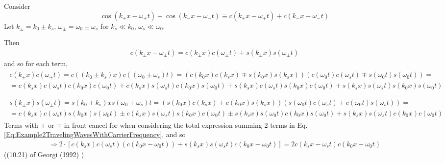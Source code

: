 \documentclass[10pt]{amsart}
\begin{document}
\begin{multicols*}{2}
Consider 
\[
\cos{ (k_+ x - \omega_+ t)} + \cos{ (k_- x - \omega_- t)} \equiv c(k_+ x - \omega_+ t) + c(k_- x - \omega_- t)
\]
Let $k_{\pm} = k_0 \pm k_s$, $\omega_{\pm} = \omega_0 \pm \omega_s$ for $k_s \ll k_0$, $\omega_s \ll \omega_0$.

Then
\begin{equation}\label{Eq:Example2TravelingWavesWithCarrierFrequency}
\begin{gathered}
	c(k_{\pm} x - \omega_{\pm}t) = c(k_{\pm} x) c(\omega_{\pm}t) + s(k_{\pm} x) s(\omega_{\pm} t) 
\end{gathered}
\end{equation}
and so for each term,
\[
\begin{gathered}
\begin{gathered}
	c(k_{\pm} x) c(\omega_{\pm} t) = c((k_0 \pm k_s) x) c((\omega_0 \pm \omega_s) t) = (c(k_0x) c(k_s x) \mp s(k_0x) s(k_s x)) (c(\omega_0 t) c(\omega_s t) \mp s(\omega_0 t) s(\omega_0 t)) = \\
= c(k_s x) c(\omega_s t)c(k_0x) c(\omega_0 t) \mp c(k_s x) s(\omega_s t) c(k_0 x) s(\omega_0t) \mp s(k_sx) c(\omega_s t) s(k_0x) c(\omega_0 t) + s(k_s x) s(\omega_s t) s(k_0x ) s(\omega_0 t) 
\end{gathered} \\
\quad \quad \\
\begin{gathered}
	s(k_{\pm}x) s(\omega_{\pm} t) = s(k_0 \pm k_s)x s(\omega_0 \pm \omega_s) t = (s(k_0x) c(k_sx) \pm c(k_0x) s(k_sx) ) (s (\omega_0 t) c(\omega_s t) \pm c(\omega_0 t) s(\omega_s t) ) = \\
	= c(k_s x) c(\omega_s t) s(k_0 x) s(\omega_0 t) \pm c(k_s x) s(\omega_s t) s(k_0x) c(\omega_0 t) \pm s(k_s x) s(\omega_0 t) c(k_0x) s(\omega_0 t) + s(k_s x) s(\omega_s t) c(k_0x) c(\omega_0 t)
\end{gathered}
\end{gathered}
\]
Terms with $\pm$ or $\mp$ in front cancel for when considering the total expression summing 2 terms in Eq. \ref{Eq:Example2TravelingWavesWithCarrierFrequency}, and so
\begin{equation}\label{Eq:SignalAndCarrierWavesAs2TravelingWaves}
\begin{gathered}
	\Longrightarrow 2 \cdot \left[ c(k_sx) c(\omega_s t) (c(k_0x - \omega_0t)) + s(k_s x) s(\omega_s t) c(k_0x - \omega_0t) \right] = 2 c(k_s x - \omega_s t) c(k_0x - \omega_0 t)
\end{gathered}
\end{equation}
((10.21) of Georgi (1992) \cite{Geor1992})


\end{multicols*}
\end{document}
